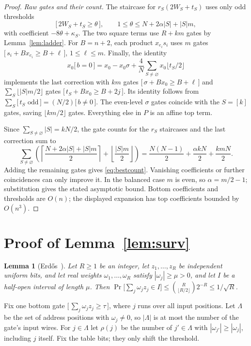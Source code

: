 \documentclass[11pt,letterpaper]{article}
\newtheorem{lemma}[theorem]{Lemma}
\theoremstyle{remark}
\newcommand{\ind}[1]{\bigl[\,#1\,\bigr]}
\begin{document}
\begin{proof}
\emph{Raw gates and their count.}
The staircase for $r_S(2W_S+t_S)$ uses only odd thresholds
\[
\ind{2W_S+t_S\ge\theta},\qquad
1\le\theta\le N+2\alpha|S|+|S|m,
\]
with coefficient $-8\theta+\kappa_S$. The two square terms use $R+km$
gates by Lemma~\ref{lem:ladder}. For $B=n+2$, each product $x_{e_i}s_i$
uses $m$ gates $\ind{s_i+Bx_{e_i}\ge B+\ell}$, $1\le\ell\le m$.
Finally, the identity
\[
x_0\ind{b=0}=x_0-x_0\sigma+
 \frac4N\sum_{S\ne\varnothing}x_0\lfloor t_S/2\rfloor
\]
implements the last correction with $km$ gates
$\ind{\sigma+Bx_0\ge B+\ell}$ and
$\sum_S\lfloor |S|m/2\rfloor$ gates
$\ind{t_S+Bx_0\ge B+2j}$. Its identity follows from
$\sum_S\ind{t_S\text{ odd}}=(N/2)\ind{b\ne0}$.
The even-level $\sigma$ gates coincide with the $S=[k]$ gates, saving
$\lfloor km/2\rfloor$ gates. Everything else in $P$ is an affine top term.

Since $\sum_{S\ne\varnothing}|S|=kN/2$, the gate counts for the $r_S$
staircases and the last correction sum to
\[
\sum_{S\ne\varnothing}\left(
 \left\lceil\frac{N+2\alpha|S|+|S|m}{2}\right\rceil
 +\left\lfloor\frac{|S|m}{2}\right\rfloor\right)
 =\frac{N(N-1)}2+\frac{\alpha kN}2+\frac{kmN}2.
\]
Adding the remaining gates gives \eqref{eq:bestcount}. Vanishing coefficients
or further coincidences can only improve it. In the balanced case $m$ is even,
so $\alpha=m/2-1$; substitution gives the stated asymptotic bound.
Bottom coefficients and thresholds are $O(n)$; the displayed
expansion has top coefficients bounded by $O(n^3)$.
\end{proof}

\section{Proof of Lemma~\ref{lem:surv}}\label{app:surv}

\begin{lemma}[Erd\H{o}s~\cite{Erdos}]\label{fact:lo}
Let $R\ge1$ be an integer, let $z_1,\dots,z_R$ be independent uniform
bits, and let real weights $\omega_1,\dots,\omega_R$ satisfy $|\omega_j|\ge\mu>0$, and let $I$ be a half-open interval of length
$\mu$. Then
$\Pr\bigl[\sum_j\omega_jz_j\in I\bigr]\le\binom{R}{\lfloor R/2\rfloor}2^{-R}\le1/\sqrt R$.
\end{lemma}

Fix one bottom gate $\ind{\sum_j\omega_jz_j\ge\tau}$, where $j$ runs over
all input positions. Let $\Lambda$ be the set of address positions with
$\omega_j\ne0$, so $|\Lambda|$ is at most the number of the gate's input wires.
For $j\in \Lambda$ let $\rho(j)$ be the number of $j'\in \Lambda$ with
$|\omega_{j'}|\ge|\omega_j|$, including $j$ itself. Fix the table bits; they
only shift the threshold.
\end{document}
